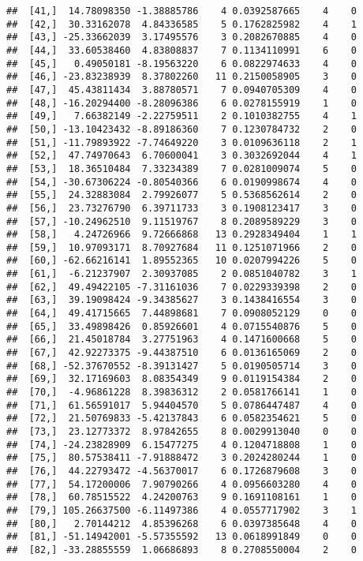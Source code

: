\documentclass[]{article}
\begin{document}
\begin{verbatim}
##  [41,]  14.78098350 -1.38885786    4 0.0392587665    4    0
##  [42,]  30.33162078  4.84336585    5 0.1762825982    4    1
##  [43,] -25.33662039  3.17495576    3 0.2082670885    4    0
##  [44,]  33.60538460  4.83808837    7 0.1134110991    6    0
##  [45,]   0.49050181 -8.19563220    6 0.0822974633    4    0
##  [46,] -23.83238939  8.37802260   11 0.2150058905    3    0
##  [47,]  45.43811434  3.88780571    7 0.0940705309    4    0
##  [48,] -16.20294400 -8.28096386    6 0.0278155919    1    0
##  [49,]   7.66382149 -2.22759511    2 0.1010382755    4    1
##  [50,] -13.10423432 -8.89186360    7 0.1230784732    2    0
##  [51,] -11.79893922 -7.74649220    3 0.0109636118    2    1
##  [52,]  47.74970643  6.70600041    3 0.3032692044    4    1
##  [53,]  18.36510484  7.33234389    7 0.0281009074    5    0
##  [54,] -30.67306224 -0.80540366    6 0.0190998674    4    0
##  [55,]  24.32883084  2.79926077    5 0.5368562614    2    0
##  [56,]  23.73276790  6.39711733    3 0.1908123417    3    0
##  [57,] -10.24962510  9.11519767    8 0.2089589229    3    0
##  [58,]   4.24726966  9.72666868   13 0.2928349404    1    1
##  [59,]  10.97093171  8.70927684   11 0.1251071966    2    0
##  [60,] -62.66216141  1.89552365   10 0.0207994226    5    0
##  [61,]  -6.21237907  2.30937085    2 0.0851040782    3    1
##  [62,]  49.49422105 -7.31161036    7 0.0229339398    2    0
##  [63,]  39.19098424 -9.34385627    3 0.1438416554    3    0
##  [64,]  49.41715665  7.44898681    7 0.0908052129    0    0
##  [65,]  33.49898426  0.85926601    4 0.0715540876    5    0
##  [66,]  21.45018784  3.27751963    4 0.1471600668    5    0
##  [67,]  42.92273375 -9.44387510    6 0.0136165069    2    0
##  [68,] -52.37670552 -8.39131427    5 0.0190505714    3    0
##  [69,]  32.17169603  8.08354349    9 0.0119154384    2    0
##  [70,]  -4.96861228  8.39836312    2 0.0581766141    1    0
##  [71,]  61.56591017  5.94404570    5 0.0786447487    4    0
##  [72,]  21.50769833 -5.42137843    6 0.0582354621    5    0
##  [73,]  23.12773372  8.97842655    8 0.0029913040    0    0
##  [74,] -24.23828909  6.15477275    4 0.1204718808    1    0
##  [75,]  80.57538411 -7.91888472    3 0.2024280244    1    0
##  [76,]  44.22793472 -4.56370017    6 0.1726879608    3    0
##  [77,]  54.17200006  7.90790266    4 0.0956603280    4    0
##  [78,]  60.78515522  4.24200763    9 0.1691108161    1    0
##  [79,] 105.26637500 -6.11497386    4 0.0557717902    3    1
##  [80,]   2.70144212  4.85396268    6 0.0397385648    4    0
##  [81,] -51.14942001 -5.57355592   13 0.0618991849    0    0
##  [82,] -33.28855559  1.06686893    8 0.2708550004    2    0

\end{verbatim}
\end{document}
